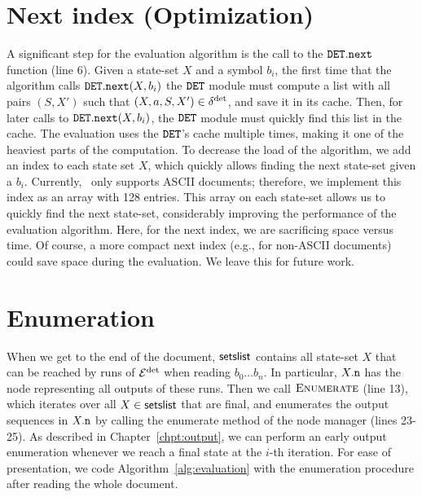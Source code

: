 \section{Next index (Optimization)} 
A significant step for the evaluation algorithm is the call to the $\mathtt{DET}.\texttt{next}$ function (line 6). Given a state-set $X$ and a symbol $b_i$, the first time that the algorithm calls $\mathtt{DET}.\texttt{next}(X, b_i)$ the $\mathtt{DET}$ module must compute a list with all pairs $(S, X')$ such that $(X,a,S,X') \in \delta^{\operatorname{det}}$, and save it in its cache. Then, for later calls to  $\mathtt{DET}.\texttt{next}(X, b_i)$, the $\mathtt{DET}$ module must quickly find this list in the cache. The evaluation uses the $\mathtt{DET}$'s cache multiple times, making it  one of the heaviest parts of the computation. To decrease the load of the algorithm, we add an index to each state set $X$, which quickly allows finding the next state-set given a $b_i$. Currently, \rematch\ only supports ASCII documents; therefore, we implement this index as an array with 128 entries. This array on each state-set allows us to quickly find the next state-set, considerably improving the performance of the evaluation algorithm. Here, for the next index, we are sacrificing space versus time. Of course, a more compact next index (e.g., for non-ASCII documents) could save space during the evaluation. We leave this for future work. 

\section{Enumeration} 
When we get to the end of the document, $\textsf{setslist}$ contains all state-set $X$ that can be reached by runs of $\mathcal{E}^{\operatorname{det}}$ when reading $b_0 \ldots b_n$. In particular, $X.\mathtt{n}$ has the node representing all outputs of these runs. Then we call $\textproc{Enumerate}$ (line 13), which iterates over all $X \in \textsf{setslist}$ that are final, and enumerates the output sequences in $X.\mathtt{n}$ by calling the enumerate method of the node manager (lines 23-25).
%
As described in Chapter~\ref{chpt:output}, we can perform an early output enumeration whenever we reach a final state at the $i$-th iteration. For ease of presentation, we code Algorithm~\ref{alg:evaluation} with the enumeration procedure after reading the whole document. %


